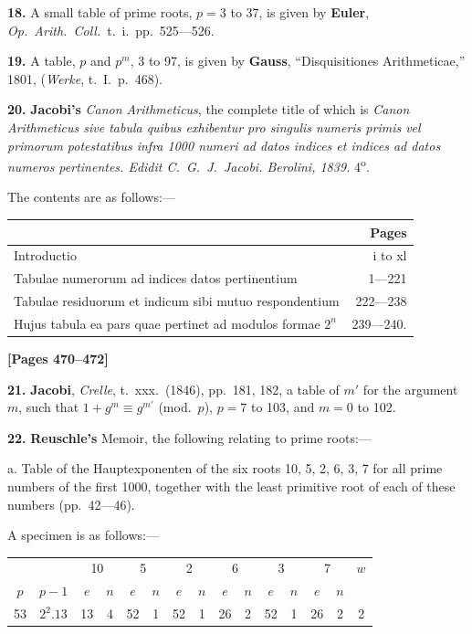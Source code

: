 \documentclass[11pt,a4paper]{book}
\begin{document}
\textbf{18.} A small table of prime roots, $p = 3$ to 37, is given by
\quad\textbf{Euler}, \textit{Op.\ Arith.\ Coll.}\ t.\ i.\ pp.\ 525---526.

\textbf{19.} A table, $p$ and $p^{m}$, 3 to 97, is given by
\quad\textbf{Gauss}, ``Disquisitiones Arithmeticae,'' 1801, (\textit{Werke}, t.\ I.\ p.\ 468).

\textbf{20.} \textbf{Jacobi's} \textit{Canon Arithmeticus}, the complete title of which is
\quad\textit{Canon Arithmeticus sive tabula quibus exhibentur pro singulis numeris primis vel primorum potestatibus infra 1000 numeri ad datos indices et indices ad datos numeros pertinentes. Edidit C.\ G.\ J.\ Jacobi. Berolini, 1839.} 4\textsuperscript{o}.

The contents are as follows:---
\begin{center}
\begin{tabular}{l|r}
 & Pages \\
\hline
Introductio & i to xl \\
Tabulae numerorum ad indices datos pertinentium & 1---221 \\
Tabulae residuorum et indicum sibi mutuo respondentium & 222---238 \\
Hujus tabula ea pars quae pertinet ad modulos formae $2^{n}$ & 239---240. \\
\end{tabular}
\end{center}

\newpage
\textbf{[Pages 470--472]}

\textbf{21.} \textbf{Jacobi}, \textit{Crelle}, t.\ xxx.\ (1846), pp.\ 181, 182, a table of $m'$ for the argument $m$,
such that $1 + g^{m} \equiv g^{m'}$ (mod.\ $p$), $p = 7$ to 103, and $m = 0$ to 102.

\textbf{22.} \textbf{Reuschle's} Memoir, the following relating to prime roots:---

a. Table of the Hauptexponenten of the six roots 10, 5, 2, 6, 3, 7 for all prime numbers of the first 1000,
together with the least primitive root of each of these numbers (pp.\ 42---46).

A specimen is as follows:---
\begin{center}
\begin{tabular}{c|c|cc|cc|cc|cc|cc|cc|c}
 & & \multicolumn{2}{c|}{10} & \multicolumn{2}{c|}{5} & \multicolumn{2}{c|}{2} & \multicolumn{2}{c|}{6} & \multicolumn{2}{c|}{3} & \multicolumn{2}{c|}{7} & $w$ \\
$p$ & $p-1$ & $e$ & $n$ & $e$ & $n$ & $e$ & $n$ & $e$ & $n$ & $e$ & $n$ & $e$ & $n$ \\
\hline
53 & $2^{2}.13$ & 13 & 4 & 52 & 1 & 52 & 1 & 26 & 2 & 52 & 1 & 26 & 2 & 2 \\
\end{tabular}
\end{center}
\end{document}
